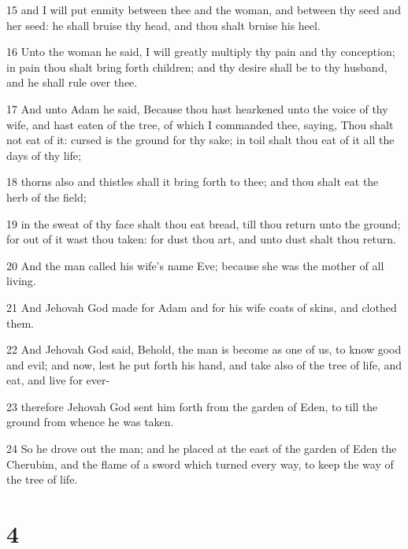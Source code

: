 \par 15 and I will put enmity between thee and the woman, and between thy seed and her seed: he shall bruise thy head, and thou shalt bruise his heel.
\par 16 Unto the woman he said, I will greatly multiply thy pain and thy conception; in pain thou shalt bring forth children; and thy desire shall be to thy husband, and he shall rule over thee.
\par 17 And unto Adam he said, Because thou hast hearkened unto the voice of thy wife, and hast eaten of the tree, of which I commanded thee, saying, Thou shalt not eat of it: cursed is the ground for thy sake; in toil shalt thou eat of it all the days of thy life;
\par 18 thorns also and thistles shall it bring forth to thee; and thou shalt eat the herb of the field;
\par 19 in the sweat of thy face shalt thou eat bread, till thou return unto the ground; for out of it wast thou taken: for dust thou art, and unto dust shalt thou return.
\par 20 And the man called his wife's name Eve; because she was the mother of all living.
\par 21 And Jehovah God made for Adam and for his wife coats of skins, and clothed them.
\par 22 And Jehovah God said, Behold, the man is become as one of us, to know good and evil; and now, lest he put forth his hand, and take also of the tree of life, and eat, and live for ever-
\par 23 therefore Jehovah God sent him forth from the garden of Eden, to till the ground from whence he was taken.
\par 24 So he drove out the man; and he placed at the east of the garden of Eden the Cherubim, and the flame of a sword which turned every way, to keep the way of the tree of life.

\chapter{4}

